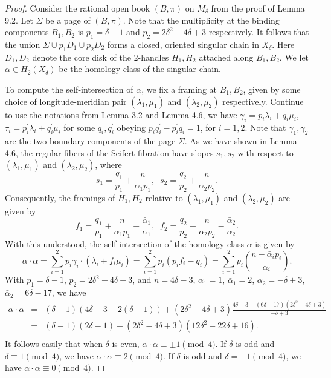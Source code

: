 \documentclass[11pt]{amsart}
\theoremstyle{plain}
\numberwithin{theorem}{section}
\theoremstyle{definition}
\begin{document}
\begin{proof}
Consider the rational open book $(B,\pi)$ on $M_\delta$ from the proof of Lemma 9.2.
Let $\Sigma$ be a page of $(B,\pi)$. Note that the multiplicity at the binding components 
$B_1,B_2$ is $p_1=\delta-1$ and $p_2=2\delta^2-4\delta+3$ respectively. It follows that the union 
$\Sigma\cup p_1D_1\cup p_2 D_2$ forms a closed, oriented singular chain 
in $X_\delta$. Here $D_1,D_2$ denote the core disk of the $2$-handles $H_1,H_2$
attached along $B_1,B_2$. We let $\alpha\in H_2(X_\delta)$ be the homology class of the singular 
chain. 

To compute the self-intersection of $\alpha$, we fix a framing at $B_1,B_2$, given by some choice
of longitude-meridian pair $(\lambda_1,\mu_1)$ and $(\lambda_2,\mu_2)$ respectively. 
Continue to use the notations from Lemma 3.2 and Lemma 4.6, we have 
$\gamma_i=p_i\lambda_i+q_i\mu_i$, $\tau_i=p_i^\prime\lambda_i+q_i^\prime \mu_i$ for
some $q_i,q_i^\prime$ obeying $p_iq_i^\prime-p_i^\prime q_i=1$, for $i=1,2$. Note that
$\gamma_1,\gamma_2$ are the two boundary components of the page $\Sigma$. 
As we have shown in Lemma 4.6, the regular fibers of the Seifert fibration have slopes $s_1,s_2$
with respect to $(\lambda_1,\mu_1)$ and $(\lambda_2,\mu_2)$, where
$$
s_1=\frac{q_1}{p_1}+\frac{n}{\alpha_1 p_1}, \;\; s_2=\frac{q_2}{p_2}+\frac{n}{\alpha_2 p_2}.
$$
Consequently, the framings of $H_1,H_2$ relative to $(\lambda_1,\mu_1)$ and $(\lambda_2,\mu_2)$
are given by
$$
f_1=\frac{q_1}{p_1}+\frac{n}{\alpha_1 p_1}-\frac{\bar{\alpha}_1}{\alpha_1},\;\;
f_2=\frac{q_2}{p_2}+\frac{n}{\alpha_2 p_2}-\frac{\bar{\alpha}_2}{\alpha_2}.
$$
With this understood, the self-intersection of the homology class $\alpha$ is given by
$$
\alpha\cdot \alpha= \sum_{i=1}^2 p_i\gamma_i\cdot (\lambda_i+f_i\mu_i)=\sum_{i=1}^2
p_i (p_if_i-q_i)= \sum_{i=1}^2 p_i (\frac{n-\bar{\alpha}_i p_i}{\alpha_i}). 
$$
With $p_1=\delta-1$, $p_2=2\delta^2-4\delta+3$, and $n=4\delta-3$, $\alpha_1=1$, 
$\bar{\alpha}_1=2$, $\alpha_2=-\delta+3$, $\bar{\alpha}_2=6\delta-17$, we have
\begin{eqnarray*}
\alpha\cdot\alpha & = &(\delta-1)(4\delta-3-2(\delta-1))+ (2\delta^2-4\delta+3)\frac{4\delta-3-(6\delta-17)(2\delta^2-4\delta+3)}{-\delta+3}\\
& = & (\delta-1)(2\delta-1)+(2\delta^2-4\delta+3)(12\delta^2-22\delta+16).\\
\end{eqnarray*}
It follows easily that when $\delta$ is even, $\alpha\cdot\alpha\equiv \pm 1\pmod{4}$. If $\delta$ is odd 
and $\delta\equiv 1\pmod{4}$, we have $\alpha\cdot\alpha\equiv 2\pmod{4}$. If $\delta$ is odd and 
$\delta=-1\pmod{4}$, we have $\alpha\cdot\alpha\equiv 0 \pmod{4}$. 


\end{proof}
\end{document}

